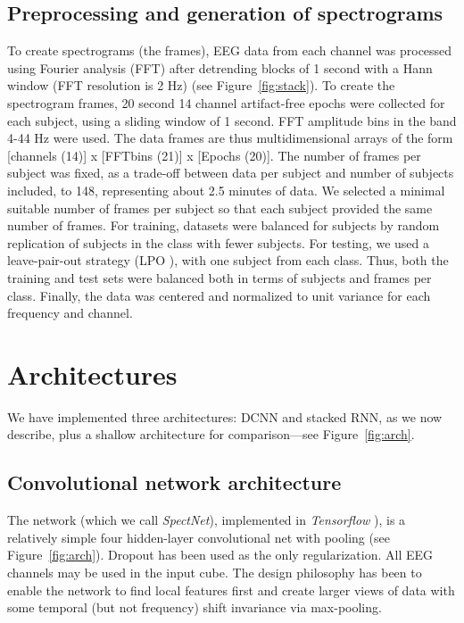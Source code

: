 \documentclass[review]{elsarticle}
\begin{document}
\subsection{Preprocessing and generation of spectrograms}
To create spectrograms (the frames), EEG data from each channel was processed using Fourier analysis (FFT) after detrending blocks of 1 second with a Hann window (FFT resolution is 2 Hz) (see Figure~\ref{fig:stack}). To create the spectrogram frames, 20 second 14 channel artifact-free epochs were collected for each subject, using a sliding window of 1 second. FFT amplitude bins in the band 4-44 Hz were used. 
The data frames are thus multidimensional arrays of the form [channels (14)] x [FFTbins (21)] x [Epochs (20)]. The number of frames per subject was fixed, as a trade-off between data per subject and number of subjects included, to 148, representing about 2.5 minutes of data. We selected a minimal suitable number of frames per subject so that each subject provided the same number of frames. For training, datasets were balanced for subjects by random replication of subjects in the class with fewer subjects. For testing, we used a leave-pair-out strategy (LPO \cite{Airola2010}), with one subject from each class. Thus, both the training and test sets were balanced both in terms of subjects and frames per class.
Finally, the data was centered and normalized to unit variance for each frequency and channel.




\section{Architectures}
We have implemented three architectures: DCNN and stacked RNN, as we now describe, plus a shallow architecture for comparison---see Figure~\ref{fig:arch}.
\subsection{Convolutional network architecture}
The network (which we call {\em SpectNet}), implemented in {\em Tensorflow} \cite{Abadi:2016aa}), is a relatively simple four hidden-layer convolutional net with pooling (see Figure~\ref{fig:arch}). Dropout has been used as the only regularization. All EEG channels may be used in the input cube. 
The design philosophy has been to enable the network to find local features first and create larger views of data with some temporal (but not frequency) shift invariance via max-pooling.
\end{document}
